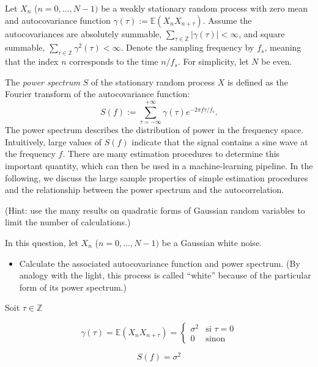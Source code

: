 \documentclass[11pt]{article}
\begin{document}
Let $X_n$ ($n=0,\dots, N-1)$ be a weakly stationary random process with zero mean and autocovariance function $\gamma(\tau):= \mathbb{E}(X_n X_{n+\tau})$.
Assume the autocovariances are absolutely summable, \ie $\sum_{\tau\in\mathbb{Z}} |\gamma(\tau)| < \infty$, and square summable, \ie $\sum_{\tau\in\mathbb{Z}} \gamma^2(\tau) < \infty$.
Denote the sampling frequency by $f_s$, meaning that the index $n$ corresponds to the time $n / f_s$. For simplicity, let $N$ be even.


The \textit{power spectrum} $S$ of the stationary random process $X$ is defined as the Fourier transform of the autocovariance function:
\begin{equation}
    S(f) := \sum_{\tau=-\infty}^{+\infty}\gamma(\tau)e^{-2\pi f\tau/f_s}.
\end{equation}
The power spectrum describes the distribution of power in the frequency space. 
Intuitively, large values of $S(f)$ indicate that the signal contains a sine wave at the frequency $f$.
There are many estimation procedures to determine this important quantity, which can then be used in a machine-learning pipeline.
In the following, we discuss the large sample properties of simple estimation procedures and the relationship between the power spectrum and the autocorrelation.

(Hint: use the many results on quadratic forms of Gaussian random variables to limit the number of calculations.)

\begin{exercise}
In this question, let $X_n$ ($n=0,\dots,N-1)$ be a Gaussian white noise.

\begin{itemize}
    \item Calculate the associated autocovariance function and power spectrum. (By analogy with the light, this process is called ``white'' because of the particular form of its power spectrum.)
\end{itemize}

\end{exercise}

\begin{solution}
Soit $\tau \in \mathbb{Z}$

\[
\gamma(\tau) = \mathbb{E}\left(X_n X_{n+\tau}\right) = \begin{cases}
\sigma^2 & \text{si } \tau = 0 \\
0 & \text{sinon}
\end{cases}
\]

\[
S(f) = \sigma^2
\]

\end{solution}
\end{document}
